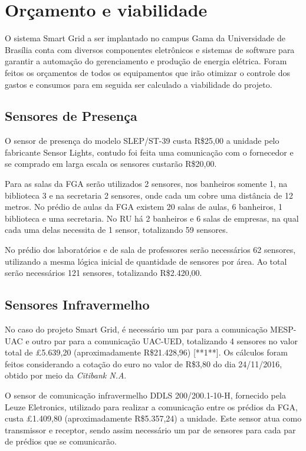\section{Orçamento e viabilidade}

O sistema Smart Grid a ser implantado no campus Gama da Universidade de Brasília conta com diversos componentes eletrônicos e sistemas de software para garantir a automação do gerenciamento e produção de energia elétrica. Foram feitos os orçamentos de todos os equipamentos que irão otimizar o controle dos gastos e consumos para em seguida ser calculado a viabilidade do projeto.

\subsection{Sensores de Presença}
O sensor de presença do modelo SLEP/ST-39 custa R\$25,00 a unidade pelo fabricante Sensor Lights, contudo foi feita uma comunicação com o fornecedor e se comprado em larga escala os sensores custarão R\$20,00.

Para as salas da FGA serão utilizados 2 sensores, nos banheiros somente 1, na biblioteca 3 e na secretaria 2 sensores, onde cada um cobre uma distância de 12 metros. No prédio de aulas da FGA existem 20 salas de aulas, 6 banheiros, 1 biblioteca e uma secretaria. No RU há 2 banheiros e 6 salas de empresas, na qual cada uma delas necessita de 1 sensor, totalizando 59 sensores.

No prédio dos laboratórios e de sala de professores serão necessários 62 sensores, utilizando a mesma lógica inicial de quantidade de sensores por área. Ao total serão necessários 121 sensores, totalizando R\$2.420,00. 

\subsection{Sensores Infravermelho}
No caso do projeto Smart Grid, é necessário um par para a comunicação MESP-UAC e outro par para a comunicação UAC-UED, totalizando 4 sensores no valor total de £5.639,20 (aproximadamente R\$21.428,96) [**1**]. Os cálculos foram feitos considerando a cotação do euro no valor de R\$3,80 do dia 24/11/2016, obtido por meio da \textit{Citibank N.A}.

O sensor de comunicação infravermelho DDLS 200/200.1-10-H, fornecido pela Leuze Eletronics, utilizado para realizar a comunicação entre os prédios da FGA, custa £1.409,80 (aproximadamente R\$5.357,24) a unidade. Este sensor atua como transmissor e receptor, sendo assim necessário um par de sensores para cada par de prédios que se comunicarão.

